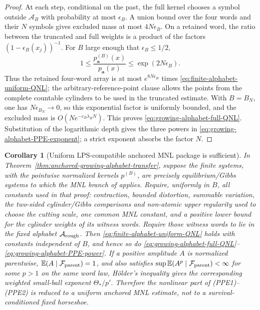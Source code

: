 \documentclass[11pt]{article}
\newtheorem{corollary}[theorem]{Corollary}
\begin{document}
\begin{proof}
At each step, conditional on the past, the full kernel chooses a symbol
outside $\mathcal A_B$ with probability at most $\epsilon_B$.  A union bound
over the four words and their $N$ symbols gives excluded mass at most
$4N\epsilon_B$.  On a retained word, the ratio between the truncated and
full weights is a product of the factors
$(1-\epsilon_B(x_j))^{-1}$.  For $B$ large enough that
$\epsilon_B\le1/2$,
\begin{equation}
\label{eq:finite-full-word-weight-comparison}
 1\le\frac{p_{\mathbf a}^{(B)}(x)}{p_{\mathbf a}(x)}
 \le \exp(2N\epsilon_B).
\end{equation}
Thus the retained four-word array is at most
$e^{8N\epsilon_B}$ times
\eqref{eq:finite-alphabet-uniform-QNL}; the arbitrary-reference-point clause
allows the points from the complete countable cylinders to be used in the
truncated estimate.  With
$B=B_N$, one has $N\epsilon_{B_N}\to0$, so this exponential factor is
uniformly bounded, and the excluded mass is
$O(Ne^{-c_B\lambda_BN})$.  This proves
\eqref{eq:growing-alphabet-full-QNL}.  Substitution of the logarithmic depth
gives the three powers in
\eqref{eq:growing-alphabet-PPE-exponent}; a strict exponent absorbs the
factor $N$.
\end{proof}

\begin{corollary}[Uniform LPS-compatible anchored MNL package is sufficient]
\label{cor:uniform-anchored-MNL-transfer}
In Theorem~\ref{thm:anchored-growing-alphabet-transfer}, suppose the
finite systems, with the pointwise normalized kernels $p^{(B)}$, are
precisely equilibrium/Gibbs systems to which the MNL branch of
\cite[Theorem~1.2 and Section~6.1]{LPS} applies.  Require, uniformly in
$B$, all constants used in that proof: contraction, bounded distortion,
summable variation, the two-sided cylinder/Gibbs comparisons and
non-atomic upper regularity used to choose the cutting scale, one common
MNL constant, and a positive lower bound for the cylinder weights of its
witness words.  Require those witness words to lie in the fixed alphabet
$\mathcal A_{\rm rough}$.  Then
\eqref{eq:finite-alphabet-uniform-QNL} holds with constants independent of
$B$, and hence so do
\eqref{eq:growing-alphabet-full-QNL}--
\eqref{eq:growing-alphabet-PPE-power}.  If a positive amplitude $A$ is
normalized parentwise, $\mathbb E(A\mid\mathcal F_{\rm parent})=1$, and
also satisfies
$\sup\mathbb E(A^p\mid\mathcal F_{\rm parent})<\infty$ for some $p>1$ on
the same word law, H\"older's inequality gives the corresponding weighted
small-ball exponent $\Theta_*/p'$.  Therefore the nonlinear part of
\textup{(PPE1)--(PPE2)} is reduced to a uniform anchored MNL estimate, not
to a survival-conditioned fixed horseshoe.
\end{corollary}
\end{document}
